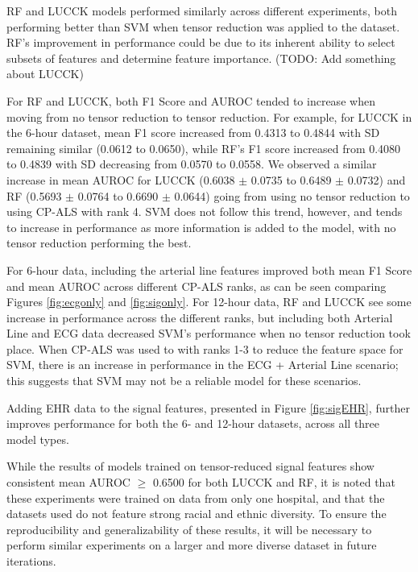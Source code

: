
RF and LUCCK models performed similarly across different experiments, both performing better than SVM when tensor reduction was applied to the dataset. RF's improvement in performance could be due to its inherent ability to select subsets of features and determine feature importance. (TODO: Add something about LUCCK)

For RF and LUCCK, both F1 Score and AUROC tended to increase when moving from no tensor reduction to tensor reduction. For example, for LUCCK in the 6-hour dataset, mean F1 score increased from 0.4313 to 0.4844 with SD remaining similar (0.0612 to 0.0650), while RF's F1 score increased from 0.4080 to 0.4839 with SD decreasing from 0.0570 to 0.0558. We observed a similar increase in mean AUROC for LUCCK (0.6038 $\pm$ 0.0735 to 0.6489 $\pm$ 0.0732) and RF (0.5693 $\pm$ 0.0764 to 0.6690 $\pm$ 0.0644) going from using no tensor reduction to using CP-ALS with rank 4. SVM does not follow this trend, however, and tends to increase in performance as more information is added to the model, with no tensor reduction performing the best.

For 6-hour data, including the arterial line features improved both mean F1 Score and mean AUROC across different CP-ALS ranks, as can be seen comparing Figures \ref{fig:ecgonly} and \ref{fig:sigonly}. For 12-hour data, RF and LUCCK see some increase in performance across the different ranks, but including both Arterial Line and ECG data decreased SVM's performance when no tensor reduction took place. When CP-ALS was used to with ranks 1-3 to reduce the feature space for SVM, there is an increase in performance in the ECG + Arterial Line scenario; this suggests that SVM may not be a reliable model for these scenarios.

Adding EHR data to the signal features, presented in Figure \ref{fig:sigEHR}, further improves performance for both the 6- and 12-hour datasets, across all three model types.

While the results of models trained on tensor-reduced signal features show consistent mean AUROC $\geq$ 0.6500 for both LUCCK and RF, it is noted that these experiments were trained on data from only one hospital, and that the datasets used do not feature strong racial and ethnic diversity. To ensure the reproducibility and generalizability of these results, it will be necessary to perform similar experiments on a larger and more diverse dataset in future iterations.

